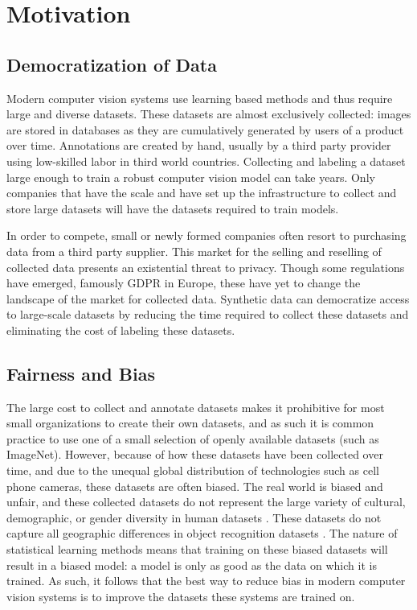 \documentclass{article}
\begin{document}
\section{Motivation}
\label{sec:motivation}

\subsection{Democratization of Data}

Modern computer vision systems use learning based methods and thus require large and diverse datasets. These datasets are almost exclusively collected: images are stored in databases as they are cumulatively generated by users of a product over time. Annotations are created by hand, usually by a third party provider using low-skilled labor in third world countries. Collecting and labeling a dataset large enough to train a robust computer vision model can take years. Only companies that have the scale and have set up the infrastructure to collect and store large datasets will have the datasets required to train models.

In order to compete, small or newly formed companies often resort to purchasing data from a third party supplier. This market for the selling and reselling of collected data presents an existential threat to privacy. Though some regulations have emerged, famously GDPR in Europe, these have yet to change the landscape of the market for collected data. Synthetic data can democratize access to large-scale datasets by reducing the time required to collect these datasets and eliminating the cost of labeling these datasets.

\subsection{Fairness and Bias}

The large cost to collect and annotate datasets makes it prohibitive for most small organizations to create their own datasets, and as such it is common practice to use one of a small selection of openly available datasets (such as ImageNet). However, because of how these datasets have been collected over time, and due to the unequal global distribution of technologies such as cell phone cameras, these datasets are often biased. The real world is biased and unfair, and these collected datasets do not represent the large variety of cultural, demographic, or gender diversity  in human datasets \cite{shankar2017classification}. These datasets do not capture all geographic differences in object recognition datasets \cite{DBLP:journals/corr/abs-1906-02659}. The nature of statistical learning methods means that training on these biased datasets will result in a biased model: a model is only as good as the data on which it is trained. As such, it follows that the best way to reduce bias in modern computer vision systems is to improve the datasets these systems are trained on.
\end{document}
